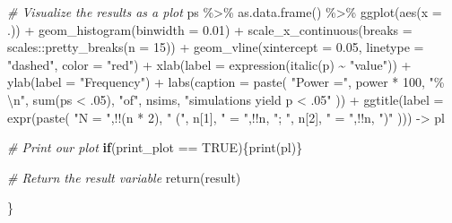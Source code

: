 \documentclass[
]{book}
\newenvironment{Shaded}{\begin{snugshade}}{\end{snugshade}}
\newcommand{\AttributeTok}[1]{\textcolor[rgb]{0.77,0.63,0.00}{#1}}
\newcommand{\CommentTok}[1]{\textcolor[rgb]{0.56,0.35,0.01}{\textit{#1}}}
\newcommand{\ConstantTok}[1]{\textcolor[rgb]{0.00,0.00,0.00}{#1}}
\newcommand{\ControlFlowTok}[1]{\textcolor[rgb]{0.13,0.29,0.53}{\textbf{#1}}}
\newcommand{\DecValTok}[1]{\textcolor[rgb]{0.00,0.00,0.81}{#1}}
\newcommand{\FloatTok}[1]{\textcolor[rgb]{0.00,0.00,0.81}{#1}}
\newcommand{\FunctionTok}[1]{\textcolor[rgb]{0.00,0.00,0.00}{#1}}
\newcommand{\NormalTok}[1]{#1}
\newcommand{\OtherTok}[1]{\textcolor[rgb]{0.56,0.35,0.01}{#1}}
\newcommand{\SpecialCharTok}[1]{\textcolor[rgb]{0.00,0.00,0.00}{#1}}
\newcommand{\StringTok}[1]{\textcolor[rgb]{0.31,0.60,0.02}{#1}}
\begin{document}
\begin{Shaded}
\begin{Highlighting}[]
\CommentTok{\# Visualize the results as a plot}
\NormalTok{  ps }\SpecialCharTok{\%\textgreater{}\%} 
    \FunctionTok{as.data.frame}\NormalTok{() }\SpecialCharTok{\%\textgreater{}\%}
    \FunctionTok{ggplot}\NormalTok{(}\FunctionTok{aes}\NormalTok{(}\AttributeTok{x =}\NormalTok{ .)) }\SpecialCharTok{+}
    \FunctionTok{geom\_histogram}\NormalTok{(}\AttributeTok{binwidth =} \FloatTok{0.01}\NormalTok{) }\SpecialCharTok{+}
    \FunctionTok{scale\_x\_continuous}\NormalTok{(}\AttributeTok{breaks =}\NormalTok{ scales}\SpecialCharTok{::}\FunctionTok{pretty\_breaks}\NormalTok{(}\AttributeTok{n =} \DecValTok{15}\NormalTok{)) }\SpecialCharTok{+}
    \FunctionTok{geom\_vline}\NormalTok{(}\AttributeTok{xintercept =} \FloatTok{0.05}\NormalTok{,}
               \AttributeTok{linetype =} \StringTok{"dashed"}\NormalTok{,}
               \AttributeTok{color =} \StringTok{"red"}\NormalTok{) }\SpecialCharTok{+}
    \FunctionTok{xlab}\NormalTok{(}\AttributeTok{label =} \FunctionTok{expression}\NormalTok{(}\FunctionTok{italic}\NormalTok{(p) }\SpecialCharTok{\textasciitilde{}} \StringTok{"value"}\NormalTok{)) }\SpecialCharTok{+}
    \FunctionTok{ylab}\NormalTok{(}\AttributeTok{label =} \StringTok{"Frequency"}\NormalTok{) }\SpecialCharTok{+}
    \FunctionTok{labs}\NormalTok{(}\AttributeTok{caption =} \FunctionTok{paste}\NormalTok{(}
      \StringTok{"Power ="}\NormalTok{,}
\NormalTok{      power }\SpecialCharTok{*} \DecValTok{100}\NormalTok{,}
      \StringTok{"\% }\SpecialCharTok{\textbackslash{}n}\StringTok{"}\NormalTok{,}
      \FunctionTok{sum}\NormalTok{(ps }\SpecialCharTok{\textless{}}\NormalTok{ .}\DecValTok{05}\NormalTok{),}
      \StringTok{"of"}\NormalTok{,}
\NormalTok{      nsims,}
      \StringTok{"simulations yield p \textless{} .05"}
\NormalTok{    )) }\SpecialCharTok{+}
    \FunctionTok{ggtitle}\NormalTok{(}\AttributeTok{label =} \FunctionTok{expr}\NormalTok{(}\FunctionTok{paste}\NormalTok{(}
      \StringTok{"N = "}\NormalTok{,}\SpecialCharTok{!!}\NormalTok{(n }\SpecialCharTok{*} \DecValTok{2}\NormalTok{),}
      \StringTok{" ("}\NormalTok{, n[}\DecValTok{1}\NormalTok{], }\StringTok{" = "}\NormalTok{,}\SpecialCharTok{!!}\NormalTok{n, }\StringTok{"; "}\NormalTok{, n[}\DecValTok{2}\NormalTok{], }\StringTok{" = "}\NormalTok{,}\SpecialCharTok{!!}\NormalTok{n, }\StringTok{")"}
\NormalTok{    ))) }\OtherTok{{-}\textgreater{}}\NormalTok{ pl}
  
  \CommentTok{\# Print our plot}
  \ControlFlowTok{if}\NormalTok{(print\_plot }\SpecialCharTok{==} \ConstantTok{TRUE}\NormalTok{)\{}\FunctionTok{print}\NormalTok{(pl)\}}

  \CommentTok{\# Return the result variable}
  \FunctionTok{return}\NormalTok{(result)}
  
\NormalTok{\}}
\end{Highlighting}
\end{Shaded}
\end{document}
